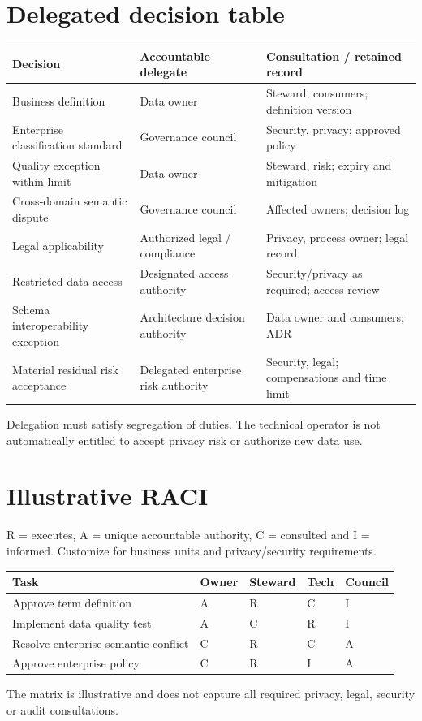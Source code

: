 \documentclass[11pt,letterpaper]{article}
\begin{document}
\section{Delegated decision table}
\begin{longtable}{p{.34\linewidth}p{.27\linewidth}p{.30\linewidth}}
\textbf{Decision} & \textbf{Accountable delegate} & \textbf{Consultation / retained record}\\\hline
Business definition & Data owner & Steward, consumers; definition version\\
Enterprise classification standard & Governance council & Security, privacy; approved policy\\
Quality exception within limit & Data owner & Steward, risk; expiry and mitigation\\
Cross-domain semantic dispute & Governance council & Affected owners; decision log\\
Legal applicability & Authorized legal / compliance & Privacy, process owner; legal record\\
Restricted data access & Designated access authority & Security/privacy as required; access review\\
Schema interoperability exception & Architecture decision authority & Data owner and consumers; ADR\\
Material residual risk acceptance & Delegated enterprise risk authority & Security, legal; compensations and time limit\\
\end{longtable}
Delegation must satisfy segregation of duties. The technical operator is not automatically entitled to accept privacy risk or authorize new data use.

\section{Illustrative RACI}
R = executes, A = unique accountable authority, C = consulted and I = informed. Customize for business units and privacy/security requirements.
\begin{longtable}{p{.38\linewidth}p{.11\linewidth}p{.11\linewidth}p{.11\linewidth}p{.11\linewidth}}
\textbf{Task} & \textbf{Owner} & \textbf{Steward} & \textbf{Tech} & \textbf{Council}\\\hline
Approve term definition & A & R & C & I\\
Implement data quality test & A & C & R & I\\
Resolve enterprise semantic conflict & C & R & C & A\\
Approve enterprise policy & C & R & I & A\\
\end{longtable}
The matrix is illustrative and does not capture all required privacy, legal, security or audit consultations.
\end{document}
